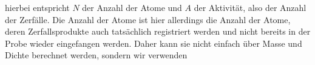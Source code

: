 hierbei entspricht $N$ der Anzahl der Atome und $A$ der Aktivität, also der Anzahl der Zerfälle. Die Anzahl der Atome ist hier allerdings die Anzahl der Atome, deren Zerfallsprodukte auch tatsächlich registriert werden und nicht bereits in der Probe wieder eingefangen werden. Daher kann sie nicht einfach über Masse und Dichte berechnet werden, sondern wir verwenden

